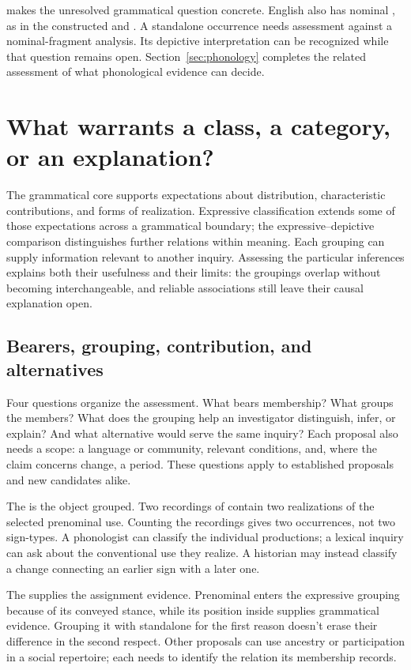 \documentclass[12pt]{article}
\begin{document}
 makes the unresolved grammatical question concrete.
English also has nominal , as in the constructed
 and . A standalone occurrence
needs assessment against a nominal-fragment analysis.
Its depictive interpretation can be recognized while that question remains
open. Section~\ref{sec:phonology} completes the related assessment of
what phonological evidence can decide.

\section{What warrants a class, a category, or an explanation?}\label{sec:assessment}

The grammatical core supports expectations about distribution, characteristic
contributions, and forms of realization. Expressive classification extends
some of those expectations across a grammatical boundary; the expressive--depictive
comparison distinguishes further relations within meaning. Each grouping
can supply information relevant to another inquiry. Assessing the particular
inferences explains both their usefulness and their limits: the groupings
overlap without becoming interchangeable, and reliable associations still
leave their causal explanation open.

\subsection{Bearers, grouping, contribution, and alternatives}

Four questions organize the assessment. What bears membership? What groups
the members? What does the grouping help an investigator distinguish,
infer, or explain? And what alternative would serve the same inquiry?
Each proposal also needs a scope: a language or community, relevant
conditions, and, where the claim concerns change, a period. These
questions apply to established proposals and new candidates alike.

The  is the object grouped. Two recordings of  contain two realizations of the selected prenominal
 use. Counting the recordings gives two occurrences, not
two sign-types. A phonologist can classify the individual productions;
a lexical inquiry can ask about the conventional use they realize.
A historian may instead classify a change connecting an earlier sign
with a later one.

The  supplies the assignment evidence. Prenominal
 enters the expressive grouping because of its conveyed
stance, while its position inside  supplies
grammatical evidence. Grouping it with standalone  for
the first reason doesn't erase their difference in the second respect.
Other proposals can use ancestry or participation in a social repertoire;
each needs to identify the relation its membership records.
\end{document}
